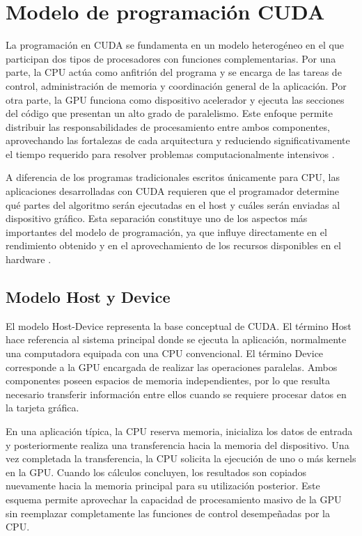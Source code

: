 \section{Modelo de programación CUDA}

La programación en CUDA se fundamenta en un modelo heterogéneo en el que participan dos tipos de procesadores con funciones complementarias. Por una parte, la CPU actúa como anfitrión del programa y se encarga de las tareas de control, administración de memoria y coordinación general de la aplicación. Por otra parte, la GPU funciona como dispositivo acelerador y ejecuta las secciones del código que presentan un alto grado de paralelismo. Este enfoque permite distribuir las responsabilidades de procesamiento entre ambos componentes, aprovechando las fortalezas de cada arquitectura y reduciendo significativamente el tiempo requerido para resolver problemas computacionalmente intensivos \cite{nvidiaProgrammingGuide,investigacionCUDA}.

A diferencia de los programas tradicionales escritos únicamente para CPU, las aplicaciones desarrolladas con CUDA requieren que el programador determine qué partes del algoritmo serán ejecutadas en el host y cuáles serán enviadas al dispositivo gráfico. Esta separación constituye uno de los aspectos más importantes del modelo de programación, ya que influye directamente en el rendimiento obtenido y en el aprovechamiento de los recursos disponibles en el hardware \cite{introduccionCUDA,nvidiaCUDA}.

\subsection{Modelo Host y Device}

El modelo Host-Device representa la base conceptual de CUDA. El término Host hace referencia al sistema principal donde se ejecuta la aplicación, normalmente una computadora equipada con una CPU convencional. El término Device corresponde a la GPU encargada de realizar las operaciones paralelas. Ambos componentes poseen espacios de memoria independientes, por lo que resulta necesario transferir información entre ellos cuando se requiere procesar datos en la tarjeta gráfica.

En una aplicación típica, la CPU reserva memoria, inicializa los datos de entrada y posteriormente realiza una transferencia hacia la memoria del dispositivo. Una vez completada la transferencia, la CPU solicita la ejecución de uno o más kernels en la GPU. Cuando los cálculos concluyen, los resultados son copiados nuevamente hacia la memoria principal para su utilización posterior. Este esquema permite aprovechar la capacidad de procesamiento masivo de la GPU sin reemplazar completamente las funciones de control desempeñadas por la CPU.

